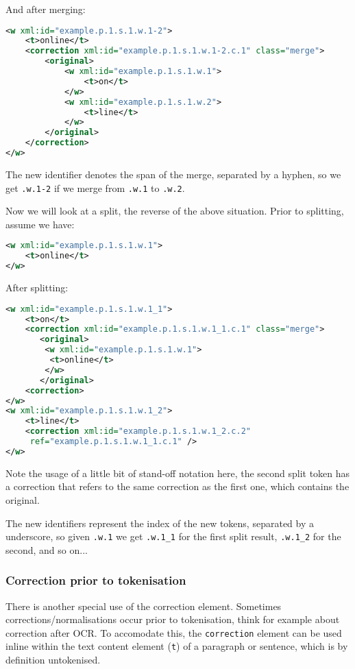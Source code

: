 \documentclass[a4paper,12pt]{report}
\begin{document}
And after merging:

\begin{lstlisting}[language=xml]
<w xml:id="example.p.1.s.1.w.1-2">
    <t>online</t>
    <correction xml:id="example.p.1.s.1.w.1-2.c.1" class="merge">
        <original>
            <w xml:id="example.p.1.s.1.w.1">
                <t>on</t>
            </w>
            <w xml:id="example.p.1.s.1.w.2">
                <t>line</t>
            </w>                         
        </original>
    </correction>       
</w>        
\end{lstlisting} 


The new identifier denotes the span of the merge, separated by a hyphen, so we get \texttt{.w.1-2} if we merge from \texttt{.w.1} to \texttt{.w.2}.

Now we will look at a split, the reverse of the above situation. Prior to splitting, assume we have:

\begin{lstlisting}[language=xml]
<w xml:id="example.p.1.s.1.w.1">
    <t>online</t>
</w>                         
\end{lstlisting}

After splitting:

\begin{lstlisting}[language=xml]
<w xml:id="example.p.1.s.1.w.1_1">
    <t>on</t>
    <correction xml:id="example.p.1.s.1.w.1_1.c.1" class="merge">
       <original>
        <w xml:id="example.p.1.s.1.w.1">
         <t>online</t>
        </w>       
       </original>
    <correction>
</w>
<w xml:id="example.p.1.s.1.w.1_2">
    <t>line</t>
    <correction xml:id="example.p.1.s.1.w.1_2.c.2" 
     ref="example.p.1.s.1.w.1_1.c.1" />
</w>
\end{lstlisting}

Note the usage of a little bit of stand-off notation here, the second split token has a correction that refers to the same correction as the first one, which contains the original.

The new identifiers represent the index of the new tokens, separated by a underscore, so given \texttt{.w.1}  we get \texttt{.w.1\_1} for the first split result, \texttt{.w.1\_2} for the second, and so on...


\subsubsection{Correction prior to tokenisation} 

There is another special use of the correction element. Sometimes corrections/normalisations occur prior to tokenisation, think for example about correction after OCR. To accomodate this, the \texttt{correction} element can be used inline within the text content element (\texttt{t}) of a paragraph or sentence, which is by definition untokenised.
\end{document}
